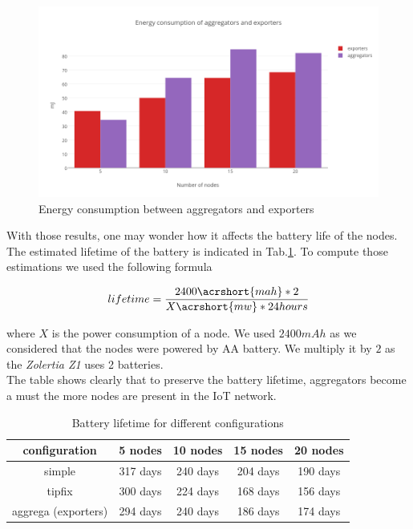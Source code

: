 \begin{figure}[h]
  \includegraphics[width=\textwidth]{res/energy_aggrega}
  \caption{Energy consumption between aggregators and exporters}
  \label{fig:aggrega_energy}
\end{figure}

With those results, one may wonder how it affects the battery life of the nodes. The estimated lifetime of the battery is indicated in Tab.\ref{tab:battery_lifetime}. To compute those estimations we used the following formula

\begin{equation}
  lifetime = \frac{2400 \acrshort{mah} * 2}{X \acrshort{mw} * 24 hours}
\end{equation}

where $X$ is the power consumption of a node. We used $2400mAh$ as we considered that the nodes were powered by AA battery. We multiply it by $2$ as the \textit{Zolertia Z1} uses 2 batteries. \\

The table shows clearly that to preserve the battery lifetime, aggregators become a must the more nodes are present in the IoT network.

\begin{table}
  \centering
  \begin{tabular}{|c|c|c|c|c|}
    \hline
    configuration & 5 nodes & 10 nodes & 15 nodes & 20 nodes \\
    \hline
    simple & 317 days & 240 days & 204 days & 190 days\\
    \hline
    tipfix & 300 days & 224 days & 168 days & 156 days\\
    \hline
    aggrega (exporters) & 294 days & 240 days & 186 days & 174 days \\
    \hline
  \end{tabular}
  \caption{Battery lifetime for different configurations}
  \label{tab:battery_lifetime}
\end{table}

